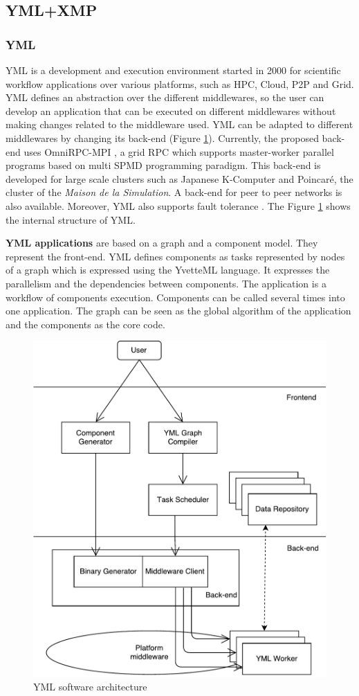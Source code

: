 \subsection{YML+XMP}

\subsubsection{YML}
YML \cite{DelaP2004} \cite{DelEP2006} is a development and execution environment started in 2000 for scientific workflow applications over various platforms, such as HPC, Cloud, P2P and Grid.
YML defines an abstraction over the different middlewares, so the user can develop an application that can be executed on different middlewares without making changes related to the middleware used.
YML can be adapted to different middlewares by changing its back-end (Figure \ref{fig:schema}).
Currently, the proposed back-end \cite{TsSHP2013} uses OmniRPC-MPI \cite{SaHTS2001} \cite{SatBT2003}, a grid RPC which supports master-worker parallel programs based on multi SPMD programming paradigm.
This back-end is developed for large scale clusters such as Japanese K-Computer and Poincar\'e, the cluster of the \textit{Maison de la Simulation}.
A back-end for peer to peer networks is also available.
Moreover, YML also supports fault tolerance \cite{TsuPS2015}.
The Figure \ref{fig:schema} shows the internal structure of YML.

\textbf{YML applications} are based on a graph and a component model.
They represent the front-end.
YML defines components as tasks represented by nodes of a graph which is expressed using the YvetteML language.
It expresses the parallelism and the dependencies between components.
The application is a workflow of components execution.
Components can be called several times into one application.
The graph can be seen as the global algorithm of the application and the components as the core code.

\begin{figure}[h]
	\caption{YML software architecture \label{fig:schema}}
	\medskip
	\centering
	\includegraphics[width=.5\textwidth]{schema.pdf}
\end{figure}

